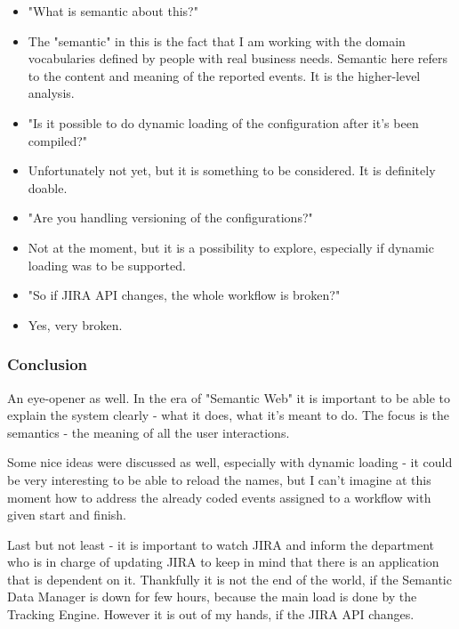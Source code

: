 \begin{itemize}
	\item "What is semantic about this?"
	\item[] The "semantic" in this is the fact that I am working with the domain vocabularies defined by people with real business needs. Semantic here refers to the content and meaning of the reported events. It is the higher-level analysis.
	
	\item "Is it possible to do dynamic loading of the configuration after it's been compiled?"
	\item[] Unfortunately not yet, but it is something to be considered. It is definitely doable.
	
	\item "Are you handling versioning of the configurations?"
	\item[] Not at the moment, but it is a possibility to explore, especially if dynamic loading was to be supported.
	
	\item "So if JIRA API changes, the whole workflow is broken?"
	\item[] Yes, very broken.
	
\end{itemize}

\subsubsection*{Conclusion}

An eye-opener as well. In the era of "Semantic Web" it is important to be able to explain the system clearly - what it does, what it's meant to do. The focus is the semantics - the meaning of all the user interactions.

Some nice ideas were discussed as well, especially with dynamic loading - it could be very interesting to be able to reload the names, but I can't imagine at this moment how to address the already coded events assigned to a workflow with given start and finish.

Last but not least - it is important to watch JIRA and inform the department who is in charge of updating JIRA to keep in mind that there is an application that is dependent on it. Thankfully it is not the end of the world, if the Semantic Data Manager is down for few hours, because the main load is done by the Tracking Engine. However it is out of my hands, if the JIRA API changes.